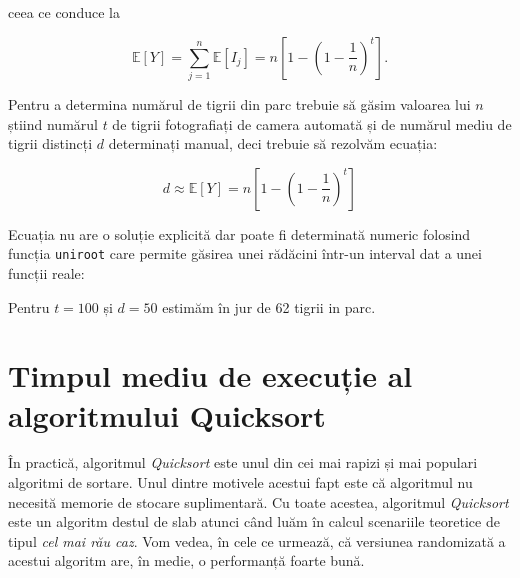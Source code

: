 \documentclass[]{article}
\newenvironment{Shaded}{\begin{snugshade}}{\end{snugshade}}
\newcommand{\KeywordTok}[1]{\textcolor[rgb]{0.13,0.29,0.53}{\textbf{#1}}}
\newcommand{\DataTypeTok}[1]{\textcolor[rgb]{0.13,0.29,0.53}{#1}}
\newcommand{\DecValTok}[1]{\textcolor[rgb]{0.00,0.00,0.81}{#1}}
\newcommand{\FloatTok}[1]{\textcolor[rgb]{0.00,0.00,0.81}{#1}}
\newcommand{\StringTok}[1]{\textcolor[rgb]{0.31,0.60,0.02}{#1}}
\newcommand{\CommentTok}[1]{\textcolor[rgb]{0.56,0.35,0.01}{\textit{#1}}}
\newcommand{\ControlFlowTok}[1]{\textcolor[rgb]{0.13,0.29,0.53}{\textbf{#1}}}
\newcommand{\OperatorTok}[1]{\textcolor[rgb]{0.81,0.36,0.00}{\textbf{#1}}}
\newcommand{\NormalTok}[1]{#1}
\begin{document}
ceea ce conduce la

\[
  \mathbb{E}[Y] = \sum_{j = 1}^{n}\mathbb{E}[I_j] = n\left[1 - \left(1 - \frac{1}{n}\right)^t\right].
\]

Pentru a determina numărul de tigrii din parc trebuie să găsim valoarea
lui \(n\) știind numărul \(t\) de tigrii fotografiați de camera automată
și de numărul mediu de tigrii distincți \(d\) determinați manual, deci
trebuie să rezolvăm ecuația:

\[
  d\approx \mathbb{E}[Y] = n\left[1 - \left(1 - \frac{1}{n}\right)^t\right]
\]

Ecuația nu are o soluție explicită dar poate fi determinată numeric
folosind funcția \texttt{uniroot} care permite găsirea unei rădăcini
într-un interval dat a unei funcții reale:

\begin{Shaded}
\end{Shaded}

Pentru \(t = 100\) și \(d = 50\) estimăm în jur de 62 tigrii in parc.

\section{Timpul mediu de execuție al algoritmului
Quicksort}\label{timpul-mediu-de-executie-al-algoritmului-quicksort}

În practică, algoritmul \emph{Quicksort} este unul din cei mai rapizi și
mai populari algoritmi de sortare. Unul dintre motivele acestui fapt
este că algoritmul nu necesită memorie de stocare suplimentară. Cu toate
acestea, algoritmul \emph{Quicksort} este un algoritm destul de slab
atunci când luăm în calcul scenariile teoretice de tipul \emph{cel mai
rău caz}. Vom vedea, în cele ce urmează, că versiunea randomizată a
acestui algoritm are, în medie, o performanță foarte bună.
\end{document}
